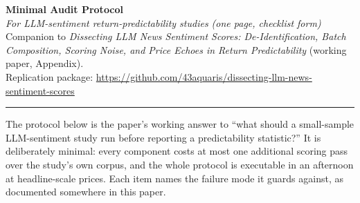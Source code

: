 \documentclass[10pt,a4paper]{article}
\begin{document}
\begin{center}
{\LARGE\bfseries Minimal Audit Protocol}\\[3pt]
{\large\itshape For LLM-sentiment return-predictability studies (one page, checklist form)}\\[6pt]
{\small Companion to \emph{Dissecting LLM News Sentiment Scores: De-Identification, Batch Composition,
Scoring Noise, and Price Echoes in Return Predictability} (working paper, Appendix).}\\[2pt]
{\small Replication package: \url{https://github.com/43aquaris/dissecting-llm-news-sentiment-scores}}
\end{center}
\vspace{2pt}
\rule{\textwidth}{0.6pt}
The protocol below is the paper's working answer to ``what should a small-sample LLM-sentiment study run before reporting a predictability statistic?'' It is deliberately minimal: every component costs at most one additional scoring pass over the study's own corpus, and the whole protocol is executable in an afternoon at headline-scale prices. Each item names the failure mode it guards against, as documented somewhere in this paper.
\end{document}

